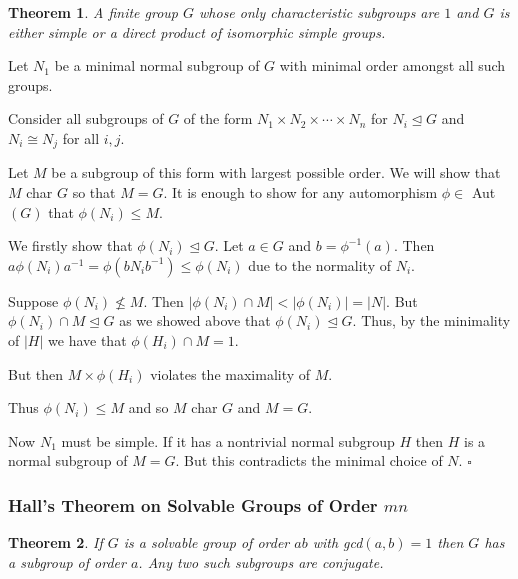 \documentclass[10pt]{article}
\newtheorem{theorem}{Theorem}[section]
\newenvironment{proof}[1][Proof]{\begin{trivlist}
\item[\hskip \labelsep {\itshape #1}]}{\end{trivlist}}
\begin{document}
\begin{theorem}
A finite group $G$ whose only characteristic subgroups are $1$ and $G$ is either simple or a direct product of isomorphic simple groups.
\end{theorem}

\begin{proof}
Let $N_1$ be a minimal normal subgroup of $G$ with minimal order amongst all such groups. 

Consider all subgroups of $G$ of the form $N_1\times N_2\times \cdots \times N_n$ for $N_i \mathrel{\unlhd} G$ and $N_i \cong N_j$ for all $i, j$.

Let $M$ be a subgroup of this form with largest possible order. We will show that $M$ char $G$ so that $M = G$. It is enough to show for any automorphism $\phi \in$ Aut$(G)$ that $\phi(N_i) \leq M$.

We firstly show that $\phi(N_i) \mathrel{\unlhd} G$. Let $a \in G$ and $b = \phi^{-1}(a)$. Then $a\phi(N_i)a^{-1} = \phi(bN_ib^{-1}) \leq \phi(N_i)$ due to the normality of $N_i$.

Suppose $\phi(N_i) \not\leq M$. Then $|\phi(N_i)\cap M| < |\phi(N_i)| = |N|$. But $\phi(N_i)\cap M \mathrel{\unlhd} G$ as we showed above that $\phi(N_i) \mathrel{\unlhd} G$. Thus, by the minimality of $|H|$ we have that $\phi(H_i)\cap M = 1$.

But then $M\times \phi(H_i)$ violates the maximality of $M$.

Thus $\phi(N_i) \leq M$ and so $M$ char $G$ and $M = G$.

Now $N_1$ must be simple. If it has a nontrivial normal subgroup $H$ then $H$ is a normal subgroup of $M = G$. But this contradicts the minimal choice of $N$. $\square$
\end{proof}

\subsubsection{Hall's Theorem on Solvable Groups of Order $mn$}

\begin{theorem}
If $G$ is a solvable group of order $ab$ with gcd$(a, b) = 1$ then $G$ has a subgroup of order $a$. Any two such subgroups are conjugate.
\end{theorem}
\end{document}
